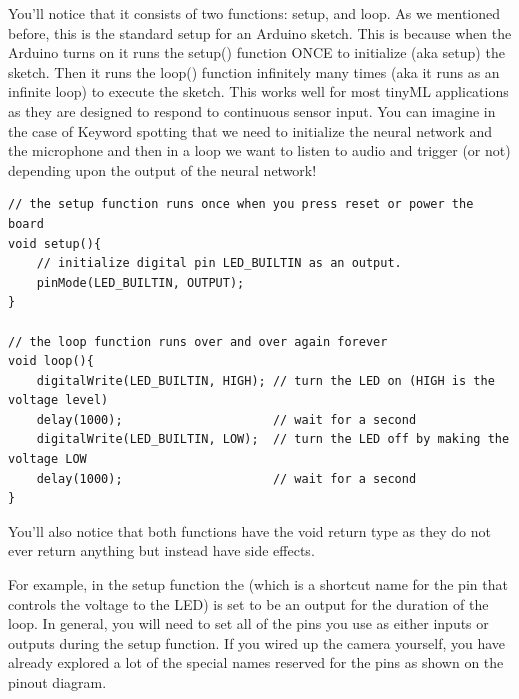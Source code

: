 You’ll notice that it consists of two functions: setup, and loop. As we mentioned before, this is the standard setup for an Arduino sketch. This is because when the Arduino turns on it runs the setup() function ONCE to initialize (aka setup) the sketch. Then it runs the loop() function infinitely many times (aka it runs as an infinite loop) to execute the sketch. This works well for most tinyML applications as they are designed to respond to continuous sensor input. You can imagine in the case of Keyword spotting that we need to initialize the neural network and the microphone and then in a loop we want to listen to audio and trigger (or not) depending upon the output of the neural network!

\begin{lstlisting}
// the setup function runs once when you press reset or power the board
void setup(){
    // initialize digital pin LED_BUILTIN as an output.
    pinMode(LED_BUILTIN, OUTPUT);
}

// the loop function runs over and over again forever
void loop(){
    digitalWrite(LED_BUILTIN, HIGH); // turn the LED on (HIGH is the voltage level)
    delay(1000);                     // wait for a second
    digitalWrite(LED_BUILTIN, LOW);  // turn the LED off by making the voltage LOW
    delay(1000);                     // wait for a second
}
\end{lstlisting}

You’ll also notice that both functions have the void return type as they do not ever return anything but instead have side effects.

For example, in the setup function the  (which is a shortcut name for the pin that controls the voltage to the LED) is set to be an output for the duration of the loop. In general, you will need to set all of the pins you use as either inputs or outputs during the setup function. If you wired up the camera yourself, you have already explored a lot of the special names reserved for the pins as shown on the pinout diagram.

